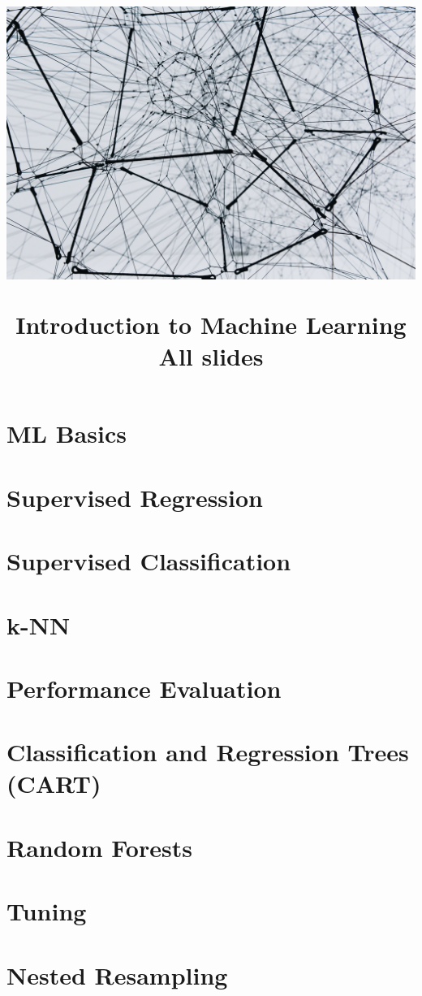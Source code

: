\documentclass[11pt,compress]{beamer}
\title{
\hspace{-0.5cm}\centerline{\includegraphics[width=1.05\paperwidth,keepaspectratio, trim={0 15cm 0 5cm}, clip]{titlepage.jpg}}
\medskip
Introduction to Machine Learning \\
\medskip
\small All slides
\vspace{-1.5cm}
}
\begin{document}

\begin{frame}
\maketitle
\end{frame}



\section{ML Basics}


\section{Supervised Regression}


\section{Supervised Classification}


\section{k-NN}


\section{Performance Evaluation}


\section{Classification and Regression Trees (CART)}


\section{Random Forests}


\section{Tuning}


\section{Nested Resampling}

  
  
\end{document}
